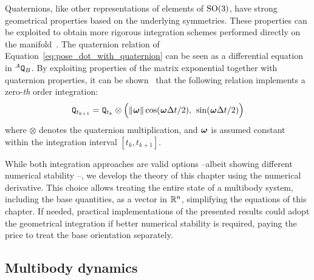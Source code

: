 \begin{remark*}
%
Quaternions, like other representations of elements of $\SO(3)$, have strong geometrical properties based on the underlying symmetries.
These properties can be exploited to obtain more rigorous integration schemes performed directly on the manifold~\parencite{andrle_geometric_2013}.
The quaternion relation of Equation~\eqref{eq:pose_dot_with_quaternion} can be seen as a differential equation in $\quat[A]_B$.
By exploiting properties of the matrix exponential together with quaternion properties, it can be shown~\parencite{andrle_geometric_2013, sola_quaternion_2017, sola_micro_2020} that the following relation implements a zero-\emph{th} order integration:
%
\begin{align*}
    \quat_{t_{k+1}} = \quat_{t_k} \otimes \left( \norm{\velang}\cos(\velang \Delta t / 2), \frac{}{} \sin(\velang \Delta t / 2) \right)
\end{align*}
%
where $\otimes$ denotes the quaternion multiplication, and $\velang$ is assumed constant within the integration interval $[t_k, t_{k+1}]$.

While both integration approaches are valid options --albeit showing different numerical stability \parencite{andrle_geometric_2013}--, we develop the theory of this chapter using the numerical derivative.
This choice allows treating the entire state of a multibody system, including the base quantities, as a vector in $\realn^n$, simplifying the equations of this chapter.
If needed, practical implementations of the presented results could adopt the geometrical integration if better numerical stability is required, paying the price to treat the base orientation separately.
%
\end{remark*}

\subsection{Multibody dynamics}

